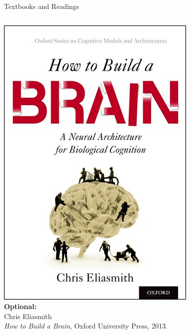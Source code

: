 \documentclass[aspectratio=169]{beamer}
\begin{document}
\begin{frame}{Textbooks and Readings}
\begin{columns}[T]
			\includegraphics[height=0.4\textheight]{media/how_to_build_a_brain_cover.png}\\
			\small
			\textbf{Optional:}\\
			Chris Eliasmith\\
			\emph{How to Build a Brain}, Oxford University Press, 2013.
	\end{columns}
\end{frame}
\end{document}
